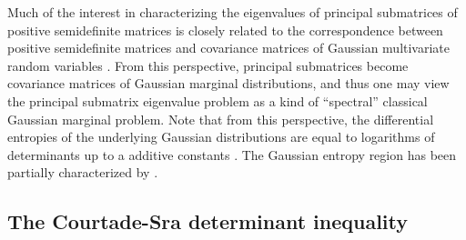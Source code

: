 \documentclass[notitlepage, 10pt]{article}
\begin{document}
{\color{blue}
\begin{rem}
    Much of the interest in characterizing the eigenvalues of principal submatrices of positive semidefinite matrices is closely related to the correspondence between positive semidefinite matrices and covariance matrices of Gaussian multivariate random variables \cite{lami2017log}.
    From this perspective, principal submatrices become covariance matrices of Gaussian marginal distributions, and thus one may view the principal submatrix eigenvalue problem as a kind of ``spectral'' classical Gaussian marginal problem.
    Note that from this perspective, the differential entropies of the underlying Gaussian distributions are equal to logarithms of determinants up to a additive constants \cite{lami2017log}. 
    The Gaussian entropy region has been partially characterized by \citeauthor{shadbakht2011entropy} \cite{shadbakht2011entropy,hassibi2008entropy}.
\end{rem}
}

\subsection{The Courtade-Sra determinant inequality}
\end{document}
